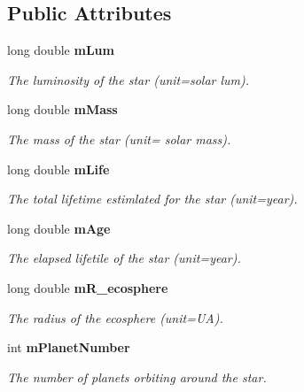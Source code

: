 \subsection*{Public Attributes}
\begin{CompactItemize}
\item 
long double {\bf m\-Lum}\label{class_s_g___star_o0}

\begin{CompactList}\small\item\em The luminosity of the star (unit=solar lum). \item\end{CompactList}\item 
long double {\bf m\-Mass}\label{class_s_g___star_o1}

\begin{CompactList}\small\item\em The mass of the star (unit= solar mass). \item\end{CompactList}\item 
long double {\bf m\-Life}\label{class_s_g___star_o2}

\begin{CompactList}\small\item\em The total lifetime estimlated for the star (unit=year). \item\end{CompactList}\item 
long double {\bf m\-Age}\label{class_s_g___star_o3}

\begin{CompactList}\small\item\em The elapsed lifetile of the star (unit=year). \item\end{CompactList}\item 
long double {\bf m\-R\_\-ecosphere}\label{class_s_g___star_o4}

\begin{CompactList}\small\item\em The radius of the ecosphere (unit=UA). \item\end{CompactList}\item 
int {\bf m\-Planet\-Number}\label{class_s_g___star_o5}

\begin{CompactList}\small\item\em The number of planets orbiting around the star. \item\end{CompactList}\end{CompactItemize}
